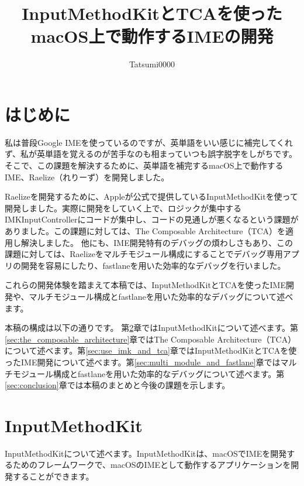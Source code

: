 \documentclass[uplatex,a4j,12pt,twocolumn]{jsarticle}
\begin{document}
\title{\vspace{-10mm}InputMethodKitとTCAを使ったmacOS上で動作するIMEの開発}
\author{Tatsumi0000}
\date{\vspace{-10mm}}
\maketitle

\section{はじめに}\label{sec:intro}
私は普段Google IMEを使っているのですが、英単語をいい感じに補完してくれず、私が英単語を覚えるのが苦手なのも相まっていつも誤字脱字をしがちです。そこで、この課題を解決するために、英単語を補完するmacOS上で動作するIME、Raelize（れりーず）を開発しました。

Raelizeを開発するために、Appleが公式で提供しているInputMethodKit\cite{bib:about_inputmethodkit}を使って開発しました。実際に開発をしていく上で、ロジックが集中するIMKInputControllerにコードが集中し、コードの見通しが悪くなるという課題がありました。この課題に対しては、The Composable Architecture（TCA）\cite{bib:the_composable_architecture}を適用し解決しました。
他にも、IME開発特有のデバッグの煩わしさもあり、この課題に対しては、Raelizeをマルチモジュール構成にすることでデバッグ専用アプリの開発を容易にしたり、fastlane\cite{bib:fastlane}を用いた効率的なデバッグを行いました。

これらの開発体験を踏まえて本稿では、InputMethodKitとTCAを使ったIME開発や、マルチモジュール構成とfastlaneを用いた効率的なデバッグについて述べます。

本稿の構成は以下の通りです。
第\ref{sec:abount_inputmethodkit}章ではInputMethodKitについて述べます。第\ref{sec:the_composable_architecture}章ではThe Composable Architecture（TCA）について述べます。第\ref{sec:use_imk_and_tca}章ではInputMethodKitとTCAを使ったIME開発について述べます。第\ref{sec:multi_module_and_fastlane}章ではマルチモジュール構成とfastlaneを用いた効率的なデバッグについて述べます。第\ref{sec:conclusion}章では本稿のまとめと今後の課題を示します。

\section{InputMethodKit}\label{sec:abount_inputmethodkit}
InputMethodKitについて述べます。InputMethodKitは、macOSでIMEを開発するためのフレームワークで、macOSのIMEとして動作するアプリケーションを開発することができます。
\end{document}
